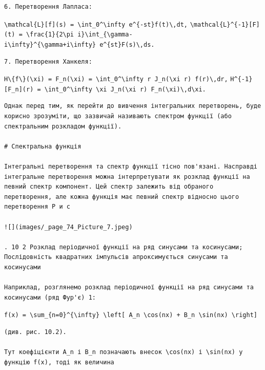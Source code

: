 \documentclass[
  ukrainian,
]{article}
\begin{document}
\begin{verbatim}
6. Перетворення Лапласа:
\end{verbatim}

\texttt{\textbackslash{}mathcal\{L\}{[}f{]}(s)\ =\ \textbackslash{}int\_0\^{}\textbackslash{}infty\ e\^{}\{-st\}f(t)\textbackslash{},dt,}
\texttt{\textbackslash{}mathcal\{L\}\^{}\{-1\}{[}F{]}(t)\ =\ \textbackslash{}frac\{1\}\{2\textbackslash{}pi\ i\}\textbackslash{}int\_\{\textbackslash{}gamma-i\textbackslash{}infty\}\^{}\{\textbackslash{}gamma+i\textbackslash{}infty\}\ e\^{}\{st\}F(s)\textbackslash{},ds.}

\begin{verbatim}
7. Перетворення Ханкеля:
\end{verbatim}

\texttt{H\textbackslash{}\{f\textbackslash{}\}(\textbackslash{}xi)\ =\ F\_n(\textbackslash{}xi)\ =\ \textbackslash{}int\_0\^{}\textbackslash{}infty\ r\ J\_n(\textbackslash{}xi\ r)\ f(r)\textbackslash{},dr,}
\texttt{H\^{}\{-1\}{[}F\_n{]}(r)\ =\ \textbackslash{}int\_0\^{}\textbackslash{}infty\ \textbackslash{}xi\ J\_n(\textbackslash{}xi\ r)\ F\_n(\textbackslash{}xi)\textbackslash{},d\textbackslash{}xi.}

\begin{verbatim}
Однак перед тим, як перейти до вивчення інтегральних перетворень, буде корисно зрозуміти, що зазвичай називають спектром функції (або спектральним розкладом функції).

# Спектральна функція

Інтегральні перетворення та спектр функції тісно пов'язані. Насправді інтегральне перетворення можна інтерпретувати як розклад функції на певний спектр компонент. Цей спектр залежить від обраного перетворення, але кожна функція має певний спектр відносно цього перетворення Р и с

![](images/_page_74_Picture_7.jpeg)

. 10 2 Розклад періодичної функції на ряд синусами та косинусами; Послідовність квадратних імпульсів апроксимується синусами та косинусами

Наприклад, розглянемо розклад періодичної функції на ряд синусами та косинусами (ряд Фур'є) 1:
\end{verbatim}

\texttt{f(x)\ =\ \textbackslash{}sum\_\{n=0\}\^{}\{\textbackslash{}infty\}\ \textbackslash{}left{[}\ A\_n\ \textbackslash{}cos(nx)\ +\ B\_n\ \textbackslash{}sin(nx)\ \textbackslash{}right{]}}

\begin{verbatim}
(див. рис. 10.2).

Тут коефіцієнти A_n і B_n позначають внесок \cos(nx) і \sin(nx) у функцію f(x), тоді як величина
\end{verbatim}
\end{document}
